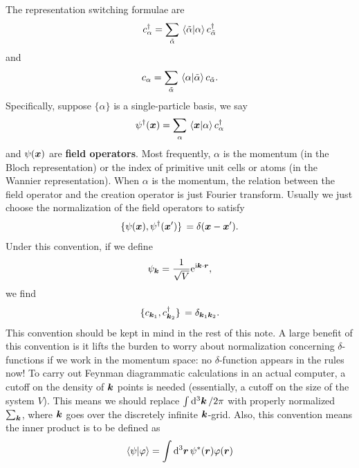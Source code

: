 \documentclass[hyperref, a4paper, 12pt]{report}
\newcommand*{\ii}{\mathrm{i}}
\newcommand*{\ee}{\mathrm{e}}
\newcommand*{\concept}[1]{{\textbf{#1}}}
\begin{document}
The representation switching formulae are 
\begin{equation}
    c_\alpha^\dagger = \sum_{\tilde{\alpha}} \braket*{\tilde{\alpha}}{\alpha} c_{\tilde{\alpha}}^\dagger
\end{equation}
and 
\begin{equation}
    c_\alpha = \sum_{\tilde{\alpha}} \braket*{\alpha}{\tilde{\alpha}} c_{\tilde{\alpha}}.
\end{equation}
Specifically, suppose $\{\alpha\}$ is a single-particle basis, 
we say 
\begin{equation}
    \psi^\dagger(\vb*{x}) = \sum_{\alpha} \braket*{\vb*{x}}{\alpha} c_\alpha^\dagger
\end{equation}
and $\psi(\vb*{x})$ are \concept{field operators}.
Most frequently, $\alpha$ is the momentum (in the Bloch representation) 
or the index of primitive unit cells or atoms (in the Wannier representation).
When $\alpha$ is the momentum, 
the relation between the field operator and the creation operator 
is just Fourier transform.
Usually we just choose the normalization of the field operators to satisfy 
\begin{equation}
    \acomm*{\psi(\vb*{x})}{\psi^\dagger(\vb*{x}')} = \delta(\vb*{x} - \vb*{x}').
\end{equation}
Under this convention, 
if we define 
\begin{equation}
    \psi_{\vb*{k}} = \frac{1}{\sqrt{V}} \ee^{\ii \vb*{k} \cdot \vb*{r}},
\end{equation}
we find 
\begin{equation}
    \acomm*{c_{\vb*{k}_1}}{c^\dagger_{\vb*{k}_2}} = \delta_{\vb*{k}_1 \vb*{k}_2}.
\end{equation}
This convention should be kept in mind in the rest of this note.
A large benefit of this convention 
is it lifts the burden to worry about normalization concerning $\delta$-functions 
if we work in the momentum space:
no $\delta$-function appears in the rules now!
To carry out Feynman diagrammatic calculations in an actual computer,
a cutoff on the density of $\vb*{k}$ points is needed
(essentially, a cutoff on the size of the system $V$).
This means we should replace $\int \dd[3]{\vb*{k}} / 2\pi $
with properly normalized $\sum_{\vb*{k}}$,
where $\vb*{k}$ goes over the discretely infinite $\vb*{k}$-grid.
Also, this convention means the inner product is to be defined as 
\begin{equation}
    \braket{\psi}{\varphi} = \int \dd[3]{\vb*{r}} \psi^*(\vb*{r}) \varphi(\vb*{r})
\end{equation}
\end{document}
